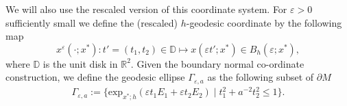 \documentclass[12pt,a4paper]{amsart}
\numberwithin{equation}{section}
\theoremstyle{plain}
\theoremstyle{definition}
\newcommand{\R}{\mathbb{R}}
\newcommand{\D}{\mathbb{D}}
\begin{document}

	We will also use the rescaled version of this coordinate system. For $\varepsilon >0$ sufficiently small we define the (rescaled) $h$-geodesic coordinate by the following map
	\begin{equation}\label{res coord}
		x^{\varepsilon}(\cdot ; x^*) : t' = (t_1, t_2) \in \D \mapsto x(\varepsilon t'; x^*) \in B_h(\varepsilon;x^*),
	\end{equation}
	where $ \mathbb{D}$ is the unit disk in $\R^2$. Given the boundary normal co-ordinate construction, we define the geodesic ellipse $\Gamma_{\varepsilon,a}$ as the following subset of $\partial M$ 
	\begin{align}\label{ellipse}
		\Gamma_{\varepsilon,a}:=\{\mathrm{exp}_{x^*;h}(\varepsilon t_1 E_1+\varepsilon t_2 E_2)\mid t_1^2+a^{-2}t_2^2\leq 1\}.
	\end{align}
\end{document}
